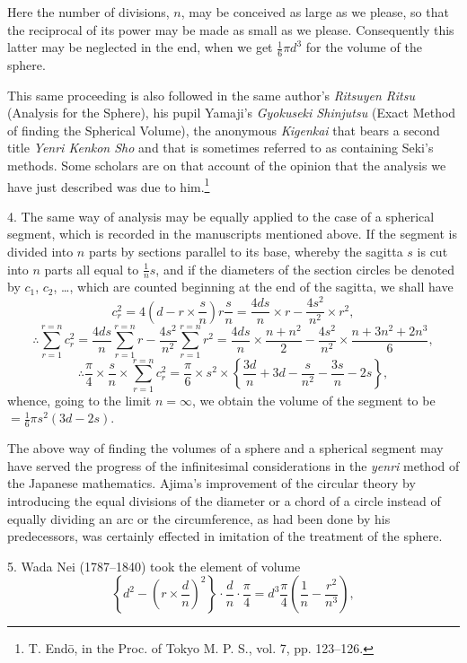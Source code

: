 \documentclass[11pt]{article}
\newcommand{\scanpage}[2]{\clearpage\setcounter{footnote}{0}\noindent{\footnotesize\color{gray}PDF page #1 · #2}\par\medskip}
\newcommand{\scanfooter}{}
\begin{document}
\scanpage{0219}{Chapter 26, printed page 205}
Here the number of divisions, $n$, may be conceived as large as we please, so that the reciprocal of its power may be made as small as we please. Consequently this latter may be neglected in the end, when we get $\frac16\pi d^3$ for the volume of the sphere.

This same proceeding is also followed in the same author's \emph{Ritsuyen Ritsu} (Analysis for the Sphere), his pupil Yamaji's \emph{Gyokuseki Shinjutsu} (Exact Method of finding the Spherical Volume), the anonymous \emph{Kigenkai} that bears a second title \emph{Yenri Kenkon Sho} and that is sometimes referred to as containing Seki's methods. Some scholars are on that account of the opinion that the analysis we have just described was due to him.\footnote{T. Endō, in the Proc. of Tokyo M. P. S., vol. 7, pp. 123--126.}

4. The same way of analysis may be equally applied to the case of a spherical segment, which is recorded in the manuscripts mentioned above. If the segment is divided into $n$ parts by sections parallel to its base, whereby the sagitta $s$ is cut into $n$ parts all equal to $\frac1n s$, and if the diameters of the section circles be denoted by $c_1$, $c_2$, \ldots, which are counted beginning at the end of the sagitta, we shall have
\[
c_r^2=4\left(d-r\times\frac{s}{n}\right)r\frac{s}{n}=\frac{4ds}{n}\times r-\frac{4s^2}{n^2}\times r^2,
\]
\[
\therefore\sum_{r=1}^{r=n}c_r^2=\frac{4ds}{n}\sum_{r=1}^{r=n}r-\frac{4s^2}{n^2}\sum_{r=1}^{r=n}r^2
=\frac{4ds}{n}\times\frac{n+n^2}{2}-\frac{4s^2}{n^2}\times\frac{n+3n^2+2n^3}{6},
\]
\[
\therefore\frac{\pi}{4}\times\frac{s}{n}\times\sum_{r=1}^{r=n}c_r^2
=\frac{\pi}{6}\times s^2\times\left\{\frac{3d}{n}+3d-\frac{s}{n^2}-\frac{3s}{n}-2s\right\},
\]
whence, going to the limit $n=\infty$, we obtain the volume of the segment to be $=\frac16\pi s^2(3d-2s)$.

The above way of finding the volumes of a sphere and a spherical segment may have served the progress of the infinitesimal considerations in the \emph{yenri} method of the Japanese mathematics. Ajima's improvement of the circular theory by introducing the equal divisions of the diameter or a chord of a circle instead of equally dividing an arc or the circumference, as had been done by his predecessors, was certainly effected in imitation of the treatment of the sphere.

5. Wada Nei (1787--1840) took the element of volume
\[
\left\{d^2-\left(r\times\frac dn\right)^2\right\}\cdot\frac dn\cdot\frac\pi4=d^3\frac\pi4\left(\frac1n-\frac{r^2}{n^3}\right),
\]
\scanfooter
\end{document}
